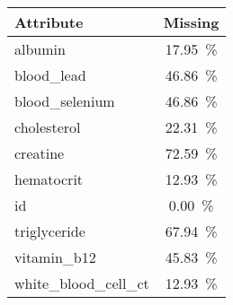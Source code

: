 \begin{tabular}{lS[table-format=2.2]}
\toprule
\textbf{Attribute} &  \textbf{Missing} \\
\midrule
albumin &      17.95\ \% \\
blood\_lead &      46.86\ \% \\
blood\_selenium &      46.86\ \% \\
cholesterol &      22.31\ \% \\
creatine &      72.59\ \% \\
hematocrit &      12.93\ \% \\
id &       0.00\ \% \\
triglyceride &      67.94\ \% \\
vitamin\_b12 &      45.83\ \% \\
white\_blood\_cell\_ct &      12.93\ \% \\
\bottomrule
\end{tabular}

